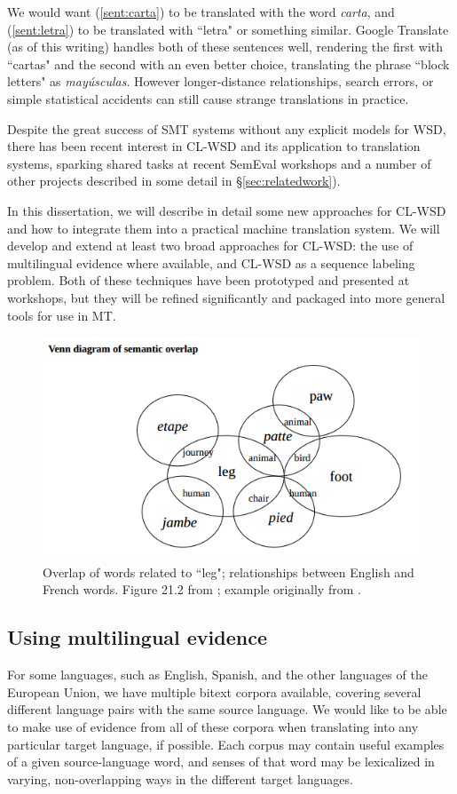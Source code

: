 We would want (\ref{sent:carta}) to be translated with the word \emph{carta},
and (\ref{sent:letra}) to be translated with ``letra" or something similar.
Google Translate (as of this writing) handles both of these sentences well,
rendering the first with ``cartas" and the second with an even better choice,
translating the phrase ``block letters" as \emph{mayúsculas}.
However longer-distance relationships, search errors, or simple statistical
accidents can still cause strange translations in practice.

Despite the great success of SMT systems without any explicit models for WSD,
there has been recent interest in CL-WSD and its application to translation
systems, sparking shared tasks at recent SemEval workshops
\cite{lefever-hoste:2010:SemEval,task10} and a number of other projects
described in some detail in \S\ref{sec:relatedwork}).

In this dissertation, we will describe in detail some new approaches for CL-WSD
and how to integrate them into a practical machine translation system.
We will develop and extend at least two broad approaches for CL-WSD: the use of
multilingual evidence where available, and CL-WSD as a sequence labeling
problem.
Both of these techniques have been prototyped and presented at workshops, but
they will be refined significantly and packaged into more general tools for use
in MT.  

\begin{figure}
  \includegraphics[width=12cm]{hutchins-leg-etc.png}
  \caption{Overlap of words related to ``leg"; relationships between English
  and French words. Figure 21.2 from \protect\cite{slp1}; example originally
  from \protect\cite[Chapter 6]{hutchins1992introduction}.}
  \label{fig:leg}
\end{figure}

\subsection{Using multilingual evidence}
For some languages, such as English, Spanish, and the other languages of the
European Union, we have multiple bitext corpora available, covering several
different language pairs with the same source language.
We would like to be able to make use of evidence from all of these corpora when
translating into any particular target language, if possible.
Each corpus may contain useful examples of a given source-language word,
and senses of that word may be lexicalized in varying, non-overlapping ways in
the different target languages.

